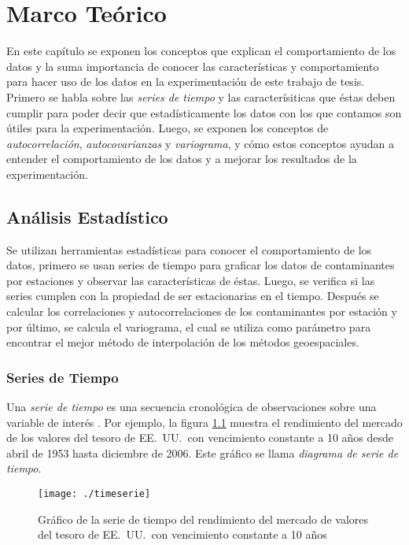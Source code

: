 \chapter{Marco Teórico}


En este capítulo se exponen los conceptos que explican el comportamiento de los datos y la suma importancia de conocer las características y comportamiento para hacer uso de los datos en la experimentación de este trabajo de tesis. Primero se habla sobre las \textit{series de tiempo} y las caracterísiticas que éstas deben cumplir para poder decir que estadísticamente los datos con los que contamos son útiles para la experimentación. Luego, se exponen los conceptos de \textit{autocorrelación}, \textit{autocovarianzas} y \textit{variograma}, y cómo estos conceptos ayudan a entender el comportamiento de los datos y a mejorar los resultados de la experimentación.

\section{Análisis Estadístico}

Se utilizan herramientas estadísticas para conocer el comportamiento de los datos, primero se usan series de tiempo para graficar los datos de contaminantes por estaciones y observar las características de éstas. Luego, se verifica si las series cumplen con la propiedad de ser estacionarias en el tiempo. Después se calcular los correlaciones y autocorrelaciones de los contaminantes por estación y por último, se calcula el variograma, el cual se utiliza como parámetro para encontrar el mejor método de interpolación de los métodos geoespaciales.

\subsection{Series de Tiempo}

Una \textit{serie de tiempo} es una secuencia cronológica de observaciones sobre una variable de interés \citep{montgomery}. Por ejemplo, la figura \ref{serie} muestra el rendimiento del mercado de los valores del tesoro de EE.\ UU.\ con vencimiento constante a 10 años desde abril de 1953 hasta diciembre de 2006. Este gráfico se llama \textit{diagrama de serie de tiempo}.

\begin{figure}[H]
\centering
\texttt{[image: ./timeserie]}
\caption{Gráfico de la serie de tiempo del rendimiento del mercado de valores del tesoro de EE.\ UU.\ con vencimiento constante a 10 años \citep{montgomery}}
\label{serie}
\end{figure}

